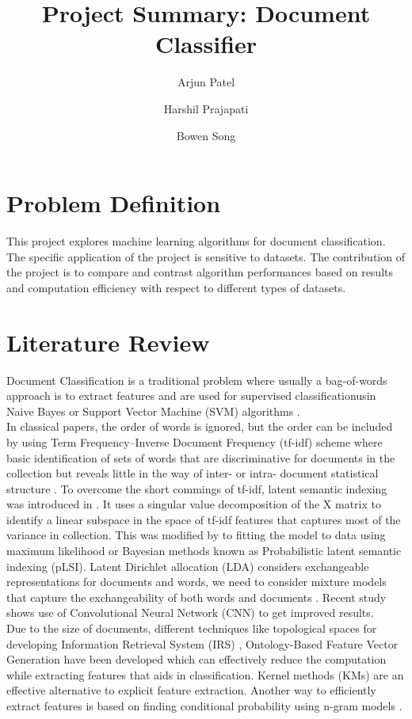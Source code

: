 \documentclass[a4paper, 11pt]{article}
\title{Project Summary: Document Classifier}
\author[1]{Arjun Patel}
\author[1]{Harshil Prajapati}
\author[1]{Bowen Song}
\affil[1]{Department of Electrical and Computer Engineering, Boston University}
\begin{document}
\maketitle
\section{Problem Definition}
This project explores machine learning algorithms for document classification. The specific application of the project is sensitive to datasets. The contribution of the project is to compare and contrast algorithm performances based on results and computation efficiency with respect to different types of datasets.
\section{Literature Review}
 Document Classification is a traditional problem where usually a bag-of-words approach is to extract features and are used for supervised classificationusin Naive Bayes or Support Vector Machine (SVM) algorithms \cite{sachan2018investigating}. \\


In classical papers, the order of words is ignored, but the order can be included by using Term Frequency–Inverse Document Frequency (tf-idf) scheme where basic identification of sets of words that are discriminative for documents in the collection but reveals little in the way of inter- or intra- document statistical structure \cite{maes1995agents}. To overcome the short commings of tf-idf, latent semantic indexing was introduced in \cite{deerwester1990indexing}. It uses a singular value decomposition of the X matrix to identify a linear subspace in the space of tf-idf features that captures most of the variance in collection. This was modified by \cite{hofmann1999probabilistic} to fitting the model to data using maximum likelihood or Bayesian methods known as Probabilistic latent semantic indexing (pLSI). Latent Dirichlet allocation (LDA) considers exchangeable representations for documents and words, we need to consider mixture models that capture the exchangeability of both words and documents \cite{blei2003latent}. Recent study shows use of Convolutional Neural Network (CNN) \cite{kim2014convolutional} to get improved results. \\

Due to the size of documents, different techniques like topological spaces for developing Information Retrieval System (IRS) \cite{parlak2018feature},  Ontology-Based Feature Vector Generation \cite{elhadad2018novel} have been developed which can effectively reduce the computation while extracting features that aids in classification. Kernel methods (KMs) are an effective alternative to explicit feature extraction. Another way to efficiently extract features is based on finding conditional probability using n-gram models \cite{furnkranz1998study} .\\
\end{document}
